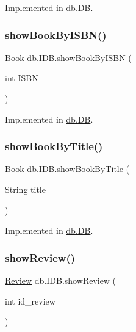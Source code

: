 Implemented in \hyperlink{classdb_1_1_d_b_a76fac3ed38eaecd5a073224d6ad51332}{db.\+DB}.

\mbox{\label{interfacedb_1_1_i_d_b_aed305f6c36ff140084636a8eded479db}} 
\subsubsection{\texorpdfstring{show\+Book\+By\+I\+S\+B\+N()}{showBookByISBN()}}
{\footnotesize\ttfamily \hyperlink{classserver_1_1data_1_1_book}{Book} db.\+I\+D\+B.\+show\+Book\+By\+I\+S\+BN (\begin{DoxyParamCaption}\item[{int}]{I\+S\+BN }\end{DoxyParamCaption})}



Implemented in \hyperlink{classdb_1_1_d_b_ae902ce95ca7433f1f7f77419f4121f4c}{db.\+DB}.

\mbox{\label{interfacedb_1_1_i_d_b_a6418edaf7c25f99f0422c0000db521fa}} 
\subsubsection{\texorpdfstring{show\+Book\+By\+Title()}{showBookByTitle()}}
{\footnotesize\ttfamily \hyperlink{classserver_1_1data_1_1_book}{Book} db.\+I\+D\+B.\+show\+Book\+By\+Title (\begin{DoxyParamCaption}\item[{String}]{title }\end{DoxyParamCaption})}



Implemented in \hyperlink{classdb_1_1_d_b_a22a4c5b98facd4506b03828697220773}{db.\+DB}.

\mbox{\label{interfacedb_1_1_i_d_b_a6c44c3135f07ec6dbef84ecc6fe4f90f}} 
\subsubsection{\texorpdfstring{show\+Review()}{showReview()}}
{\footnotesize\ttfamily \hyperlink{classserver_1_1data_1_1_review}{Review} db.\+I\+D\+B.\+show\+Review (\begin{DoxyParamCaption}\item[{int}]{id\+\_\+review }\end{DoxyParamCaption})}



